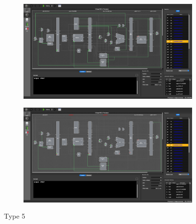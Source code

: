 \documentclass[12pt, a4paper]{article}
\begin{document}
\begin{figure}[htbp]
\begin{subfigure}{\linewidth}
\centering
\includegraphics[width=.89\linewidth]{5a}
\caption{}
\label{fig:5a}
\end{subfigure}
\begin{subfigure}{\linewidth}
\centering
\includegraphics[width=.89\linewidth]{5b}
\caption{}
\label{fig:5b}
\end{subfigure}
\caption{Type 5}
\label{fig:5}
\end{figure}
\end{document}
